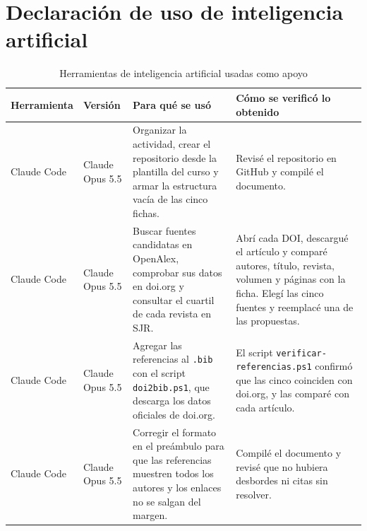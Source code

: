 \documentclass[11pt,a4paper]{article}
\begin{document}
\section{Declaración de uso de inteligencia artificial}

\begin{table}[H]
  \centering
  \caption{Herramientas de inteligencia artificial usadas como apoyo}
  \label{tab:declaracion-ia}
  \begin{tabularx}{\textwidth}{@{}ll>{\raggedright\arraybackslash}X>{\raggedright\arraybackslash}X@{}}
    \toprule
    \textbf{Herramienta} & \textbf{Versión} & \textbf{Para qué se usó} & \textbf{Cómo se verificó lo obtenido} \\
    \midrule
    Claude Code & Claude Opus 5.5 & Organizar la actividad, crear el repositorio desde la plantilla del curso y armar la estructura vacía de las cinco fichas. & Revisé el repositorio en GitHub y compilé el documento. \\
    \addlinespace
    Claude Code & Claude Opus 5.5 & Buscar fuentes candidatas en OpenAlex, comprobar sus datos en doi.org y consultar el cuartil de cada revista en SJR. & Abrí cada DOI, descargué el artículo y comparé autores, título, revista, volumen y páginas con la ficha. Elegí las cinco fuentes y reemplacé una de las propuestas. \\
    \addlinespace
    Claude Code & Claude Opus 5.5 & Agregar las referencias al \texttt{.bib} con el script \texttt{doi2bib.ps1}, que descarga los datos oficiales de doi.org. & El script \texttt{verificar-\allowbreak referencias.ps1} confirmó que las cinco coinciden con doi.org, y las comparé con cada artículo. \\
    \addlinespace
    Claude Code & Claude Opus 5.5 & Corregir el formato en el preámbulo para que las referencias muestren todos los autores y los enlaces no se salgan del margen. & Compilé el documento y revisé que no hubiera desbordes ni citas sin resolver. \\
    \bottomrule
  \end{tabularx}
\end{table}

\printbibliography[heading=bibintoc,title={Referencias}]
\end{document}
